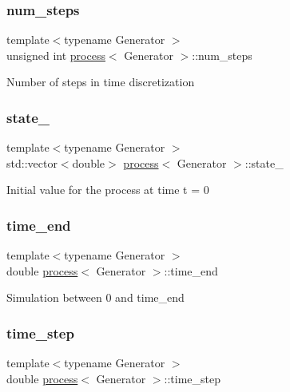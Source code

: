 \subsubsection{\texorpdfstring{num\+\_\+steps}{num\_steps}}
{\footnotesize\ttfamily template$<$typename Generator $>$ \\
unsigned int \mbox{\hyperlink{classprocess}{process}}$<$ Generator $>$\+::num\+\_\+steps\hspace{0.3cm}{\ttfamily [protected]}}

Number of steps in time discretization \mbox{\label{classprocess_ab4d01c8ea2e9c8285134786d32ae42aa}} 
\subsubsection{\texorpdfstring{state\+\_}{state\_0}}
{\footnotesize\ttfamily template$<$typename Generator $>$ \\
std\+::vector$<$double$>$ \mbox{\hyperlink{classprocess}{process}}$<$ Generator $>$\+::state\+\_\hspace{0.3cm}{\ttfamily [protected]}}

Initial value for the process at time t = 0 \mbox{\label{classprocess_aee60ec54e570201c8c115005aa0a4f30}} 
\subsubsection{\texorpdfstring{time\+\_\+end}{time\_end}}
{\footnotesize\ttfamily template$<$typename Generator $>$ \\
double \mbox{\hyperlink{classprocess}{process}}$<$ Generator $>$\+::time\+\_\+end\hspace{0.3cm}{\ttfamily [protected]}}

Simulation between 0 and time\+\_\+end \mbox{\label{classprocess_a058283b545a3ac9733136b6f48177586}} 
\subsubsection{\texorpdfstring{time\+\_\+step}{time\_step}}
{\footnotesize\ttfamily template$<$typename Generator $>$ \\
double \mbox{\hyperlink{classprocess}{process}}$<$ Generator $>$\+::time\+\_\+step\hspace{0.3cm}{\ttfamily [protected]}}

